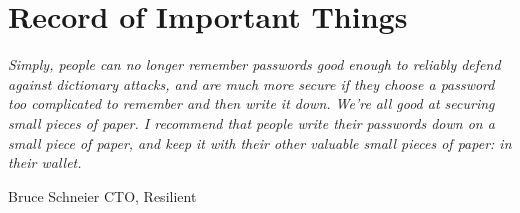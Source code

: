 \documentclass[9pt,showtrims]{memoir} %
\begin{document}



\newpage

\chapter*{Record of Important Things}


\textit{Simply, people can no longer remember passwords good enough to reliably defend against dictionary attacks, and are much more secure if they choose a password too complicated to remember and then write it down. We're all good at securing small pieces of paper. I recommend that people write their passwords down on a small piece of paper, and keep it with their other valuable small pieces of paper: in their wallet.}
\begin{flushright}{Bruce Schneier CTO, Resilient}\end{flushright}



\clearpage
{}























\newpage
\fontsize{4}{4}\selectfont
\begin{multicols}{4}
	\noindent
\end{multicols}
\normalsize




\end{document}
